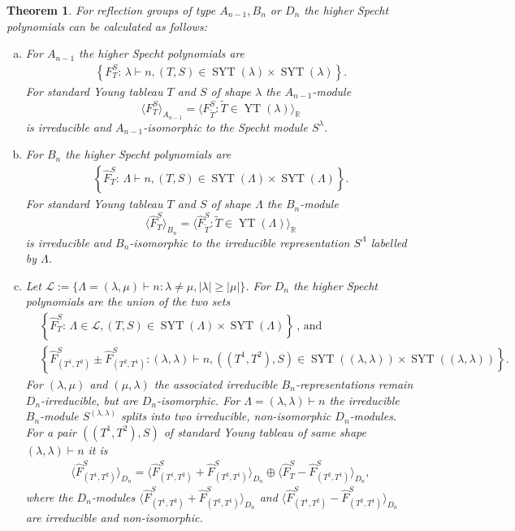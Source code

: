 \documentclass[11pt,a4paper]{amsart}
\numberwithin{equation}{section}
\newtheorem{thm}{Theorem}
\theoremstyle{definition}
\newcommand{\R}{\mathbb{R}}
\DeclareMathOperator{\SYT}{SYT}
\DeclareMathOperator{\YT}{YT}
\numberwithin{thm}{section}
\theoremstyle{break}
\numberwithin{subcase}{case}
\begin{document}
\begin{thm}\label{thm:irreducible reps}\cite{morita1998higher}
For reflection groups of type $A_{n-1},B_n$ or $D_n$ the higher Specht polynomials can be calculated as follows: 
\begin{enumerate}[a)]
\item For $A_{n-1}$ the higher Specht polynomials are \begin{align*}
        \left\{ F_{T}^S : \, \lambda \vdash n, (T,S) \in \SYT ( \lambda) \times \SYT (\lambda) \right\}.
    \end{align*} For standard Young tableau $T$ and $S$ of shape $\lambda$ the $A_{n-1}$-module $$\langle F_{T}^S \rangle_{A_{n-1}} = \langle F_{\widetilde{T}}^S : \widetilde{T} \in  \YT (\lambda) \rangle_\R$$ is irreducible and $A_{n-1}$-isomorphic to the Specht module $S^{\lambda}$.
\item For $B_n$ the higher Specht polynomials are \begin{align*}
    \left\{ \widehat{F}_T^S : \, \Lambda \vdash n, (T,S) \in \SYT ( \Lambda) \times \SYT (\Lambda) \right\}.
    \end{align*} For standard Young tableau $T$ and $S$ of shape $\Lambda$ the $B_n$-module $$    \langle \widehat{F}_{T}^S \rangle_{B_n} = \langle \widehat{F}_{\widetilde{T}}^S : \widetilde{T} \in \YT (\Lambda) \rangle_\R$$ is irreducible and $B_n$-isomorphic to the irreducible representation $S^{\Lambda}$ labelled by $\Lambda$. 
\item  Let $\mathcal{L} := \{ \Lambda =(\lambda,\mu) \vdash n : \lambda \neq \mu, |\lambda|\geq |\mu|\}$. For $D_n$ the higher Specht polynomials are the union of the two sets
 \begin{align*}
     & \left\{ \widehat{F}_T^S : \,  \Lambda \in \mathcal{L}, (T,S) \in \SYT (\Lambda) \times \SYT (\Lambda) \right\} \,\text{, and} \\ 
   &  \left\{ \widehat{F}_{(T^1,T^2)}^S \pm \widehat{F}_{(T^2,T^1)}^S : (\lambda,\lambda) \vdash n, ((T^1,T^2),S) \in \SYT ((\lambda,\lambda)) \times \SYT ((\lambda,\lambda)) \right\}.
 \end{align*}
 For $(\lambda,\mu)$ and $(\mu,\lambda)$ the associated irreducible $B_n$-representations remain $D_n$-irreducible, but are $D_n$-isomorphic. For $ \Lambda = (\lambda,\lambda) \vdash n$ the irreducible $B_n$-module $S^{(\lambda,\lambda)}$ splits into two irreducible, non-isomorphic $D_n$-modules. For a pair $((T^1,T^2),S)$ of standard Young tableau of same shape $ (\lambda,\lambda) \vdash n$ it is \begin{align*}
        \langle \widehat{F}_{(T^1,T^2)}^S \rangle_{D_n} = \langle \widehat{F}_{(T^1,T^2)}^S + \widehat{F}_{(T^2,T^1)}^S \rangle_{D_n} \oplus \langle \widehat{F}_T^S - \widehat{F}_{(T^2,T^1)}^S \rangle_{D_n},
    \end{align*} where the $D_n$-modules $ \langle \widehat{F}_{(T^1,T^2)}^S + \widehat{F}_{(T^2,T^1)}^S \rangle_{D_n}$ and $\langle \widehat{F}_{(T^1,T^2)}^S - \widehat{F}_{(T^2,T^1)}^S \rangle_{D_n}$ are irreducible and non-isomorphic. 
    \end{enumerate}
\end{thm}
    
\end{document}
